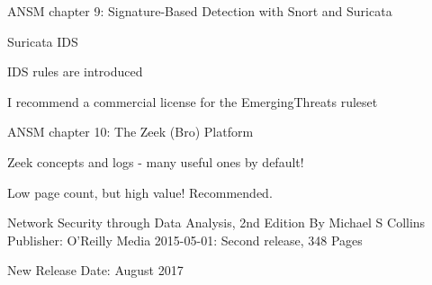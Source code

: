 \documentclass[Screen16to9,17pt]{foils}
\begin{document}


\begin{list1}
\item ANSM chapter 9: Signature-Based Detection with Snort and Suricata
\begin{list2}
\item Suricata IDS
\item IDS rules are introduced
\item I recommend a commercial license for the EmergingThreats ruleset
\end{list2}
\end{list1}



\begin{list1}
\item ANSM chapter 10: The Zeek (Bro) Platform
\begin{list2}
\item Zeek concepts and logs - many useful ones by default!
\end{list2}
\end{list1}




Low page count, but high value! Recommended.

Network Security through Data Analysis, 2nd Edition
By Michael S Collins
Publisher: O'Reilly Media
2015-05-01: Second release, 348 Pages

New Release Date: August 2017
\end{document}
